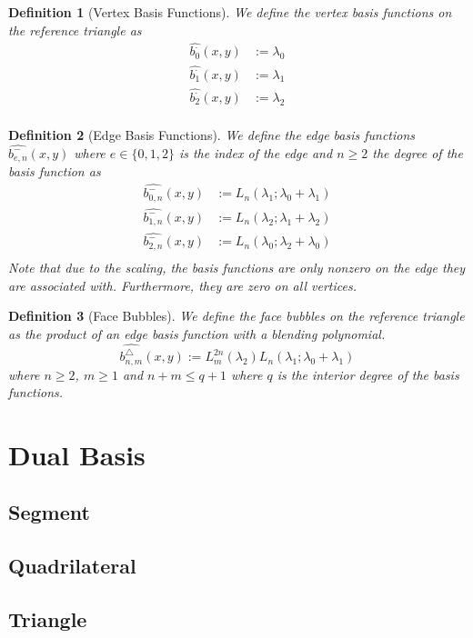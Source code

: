 \documentclass[10pt,a4paper]{article}
\newtheorem{defn}{Definition}
\begin{document}
    \begin{defn}[Vertex Basis Functions]
        We define the vertex basis functions on the reference triangle as
        \begin{align*}
            \widehat{b_0^{\cdot}}(x,y) &:= \lambda_0 \\
            \widehat{b_1^{\cdot}}(x,y) &:= \lambda_1 \\
            \widehat{b_2^{\cdot}}(x,y) &:= \lambda_2 \\
        \end{align*}
    \end{defn}

    \begin{defn}[Edge Basis Functions]
        We define the edge basis functions $\widehat{b_{e,n}^{-}}(x,y)$ where $e \in \{0,1,2\}$ is the index of the edge and $n \geq 2$ the degree of the basis function as
        \begin{align*}
            \widehat{b_{0,n}^{-}}(x,y) &:= L_n(\lambda_1 ; \lambda_0+\lambda_1) \\
            \widehat{b_{1,n}^{-}}(x,y) &:= L_n(\lambda_2 ; \lambda_1+\lambda_2) \\
            \widehat{b_{2,n}^{-}}(x,y) &:= L_n(\lambda_0 ; \lambda_2+\lambda_0) \\
        \end{align*}
        Note that due to the scaling, the basis functions are only nonzero on the edge they are associated with. Furthermore, they are zero on all vertices.
    \end{defn}

    \begin{defn}[Face Bubbles]
        We define the face bubbles on the reference triangle as the product of an edge basis function with a blending polynomial.
        \begin{equation*}
            \widehat{b_{n,m}^{\triangle}}(x,y) := L_m^{2n}(\lambda_2)L_n(\lambda_1 ; \lambda_0+\lambda_1)
        \end{equation*}
        where $n \geq 2$, $m \geq 1$ and $n+m \leq q+1$ where $q$ is the interior degree of the basis functions.
    \end{defn}


\section{Dual Basis}


\subsection{Segment}


\subsection{Quadrilateral}


\subsection{Triangle}
    
\end{document}
